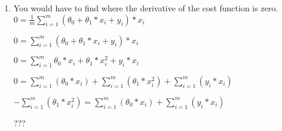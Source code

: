 \documentclass{article}
\begin{document}
\begin{enumerate}
    \item
        You would have to find where the derivative of the cost function is
        zero.
        $0 = \frac{1}{m} \sum\limits_{i=1}^m(\theta_0 + \theta_1*x_i + y_i) * x_i$

        $0 = \sum\limits_{i=1}^m(\theta_0 + \theta_1*x_i + y_i) * x_i$

        $0 = \sum\limits_{i=1}^m\theta_0*x_i + \theta_1*x_i^2 + y_i*x_i$

        $0 = \sum\limits_{i=1}^m(\theta_0*x_i) +
        \sum\limits_{i=1}^m(\theta_1*x_i^2) + \sum\limits_{i=1}^m(y_i*x_i)$

        $-\sum\limits_{i=1}^m(\theta_1*x_i^2)  = \sum\limits_{i=1}^m(\theta_0*x_i) +
        \sum\limits_{i=1}^m(y_i*x_i)$

        ???
\end{enumerate}
\end{document}
